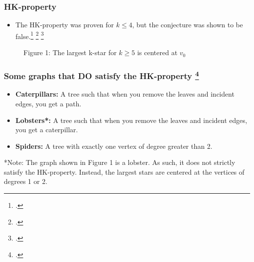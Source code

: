 \documentclass[10pt,]{beamer}
\theoremstyle{conjectureStyle}
\theoremstyle{notationStyle}
\theoremstyle{claimStyle}
\begin{document}
\begin{frame}\frametitle{HK-property}
    \begin{itemize}
        \item The HK-property was proven for $k \leq 4$, but the conjecture was shown to be false.\footcite{MR2523796} \footcite{MR3612439} \footcite{MR3271819}
    \end{itemize}

    \begin{figure}
        \centering
        \caption*{Figure 1: The largest k-star for $k \geq 5$ is centered at $v_0$}
    \end{figure}
\end{frame}

\begin{frame}\frametitle{Some graphs that DO satisfy the HK-property \footcite{MR2763040}}
    \begin{itemize}
        \item \textbf{Caterpillars:} A tree such that when you remove the leaves and incident edges, you get a path.
        \item \textbf{Lobsters*:} A tree such that when you remove the leaves and incident edges, you get a caterpillar.
        \item \textbf{Spiders:} A tree with exactly one vertex of degree greater than 2.
    \end{itemize}

    *Note: The graph shown in Figure 1 is a lobster. As such, it does not strictly satisfy the HK-property. Instead, the largest stars are centered at the vertices of degrees 1 or 2.
\end{frame}
\end{document}
